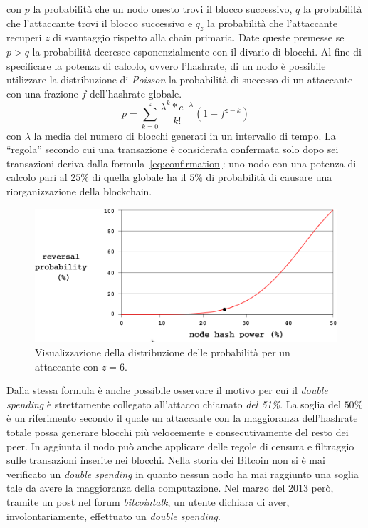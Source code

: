 con $p$ la probabilità che un nodo onesto trovi il blocco successivo, $q$ la probabilità che l'attaccante trovi il blocco successivo e $q_{z}$ la probabilità che l'attaccante recuperi $z$ di svantaggio rispetto alla chain primaria. Date queste premesse se $p>q$ la probabilità decresce esponenzialmente con il divario di blocchi. Al fine di specificare la potenza di calcolo, ovvero l'hashrate, di un nodo è possibile utilizzare la distribuzione di \textit{Poisson} la probabilità di successo di un attaccante con una frazione $f$ dell'hashrate globale.
\begin{equation}\label{eq:confirmation}
    p=\sum_{k=0}^{z} \frac{\lambda^{k}*e^{-\lambda}}{k!}(1-f^{z-k})
\end{equation}
con $\lambda$ la media del numero di blocchi generati in un intervallo di tempo. La ``regola'' secondo cui una transazione è considerata confermata solo dopo sei transazioni deriva dalla formula~\ref{eq:confirmation}: uno nodo con una potenza di calcolo pari al $25\%$ di quella globale ha il $5\%$ di probabilità di causare una riorganizzazione della blockchain.
\begin{figure}[H]
    \centering
    \includegraphics[width=\textwidth]{images/hashrate_curve.png}
    \caption{Visualizzazione della distribuzione delle probabilità per un attaccante con $z=6$.}
\end{figure}
Dalla stessa formula è anche possibile osservare il motivo per cui il \textit{double spending} è strettamente collegato all'attacco chiamato \textit{del 51\%}. La soglia del $50\%$ è un riferimento secondo il quale un attaccante con la maggioranza dell'hashrate totale possa generare blocchi più velocemente e consecutivamente del resto dei peer. In aggiunta il nodo può anche applicare delle regole di censura e filtraggio sulle transazioni inserite nei blocchi.\newline
Nella storia dei Bitcoin non si è mai verificato un \textit{double spending} in quanto nessun nodo ha mai raggiunto una soglia tale da avere la maggioranza della computazione. Nel marzo del 2013 però, tramite un post nel forum \href{https://bitcointalk.org/index.php?topic=152348.0}{\textit{bitcointalk}}, un utente dichiara di aver, involontariamente, effettuato un \textit{double spending}.
